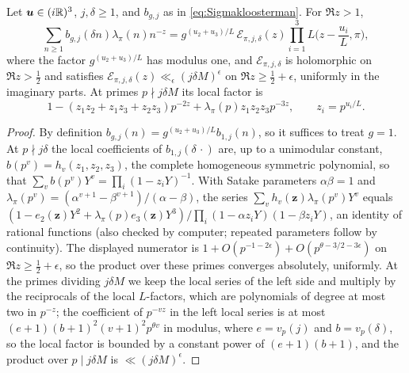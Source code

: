 \documentclass[11pt,colorlinks]{charlie}
\begin{document}
\begin{lemma}\label{lem:euler}
Let $\boldsymbol u\in(i\mathbb{R})^3$, $j,\delta\ge1$, and $b_{g,j}$ as in \eqref{eq:Sigmakloosterman}. For $\Re z>1$,
\[
 \sum_{n\ge1}b_{g,j}(\delta n)\lambda_\pi(n)n^{-z}=g^{(u_2+u_3)/L}\,\mathcal E_{\pi,j,\delta}(z)\prod_{i=1}^3L\Big(z-\frac{u_i}L,\pi\Big),
\]
where the factor $g^{(u_2+u_3)/L}$ has modulus one, and $\mathcal E_{\pi,j,\delta}$ is holomorphic on $\Re z>\frac12$ and satisfies $\mathcal E_{\pi,j,\delta}(z)\ll_\epsilon(j\delta M)^\epsilon$ on $\Re z\ge\frac12+\epsilon$, uniformly in the imaginary parts. At primes $p\nmid j\delta M$ its local factor is
\[
 1-(z_1z_2+z_1z_3+z_2z_3)p^{-2z}+\lambda_\pi(p)z_1z_2z_3p^{-3z},\qquad z_i=p^{u_i/L}.
\]
\end{lemma}
\begin{proof}
By definition $b_{g,j}(n)=g^{(u_2+u_3)/L}b_{1,j}(n)$, so it suffices to treat $g=1$. At $p\nmid j\delta$ the local coefficients of $b_{1,j}(\delta\,\cdot)$ are, up to a unimodular constant, $b(p^v)=h_v(z_1,z_2,z_3)$, the complete homogeneous symmetric polynomial, so that $\sum_vb(p^v)Y^v=\prod_i(1-z_iY)^{-1}$. With Satake parameters $\alpha\beta=1$ and $\lambda_\pi(p^v)=(\alpha^{v+1}-\beta^{v+1})/(\alpha-\beta)$, the series $\sum_vh_v(\boldsymbol z)\lambda_\pi(p^v)Y^v$ equals $(1-e_2(\boldsymbol z)Y^2+\lambda_\pi(p)e_3(\boldsymbol z)Y^3)/\prod_i(1-\alpha z_iY)(1-\beta z_iY)$, an identity of rational functions (also checked by computer; repeated parameters follow by continuity). The displayed numerator is $1+O(p^{-1-2\epsilon})+O(p^{\theta-3/2-3\epsilon})$ on $\Re z\ge\frac12+\epsilon$, so the product over these primes converges absolutely, uniformly. At the primes dividing $j\delta M$ we keep the local series of the left side and multiply by the reciprocals of the local $L$-factors, which are polynomials of degree at most two in $p^{-z}$; the coefficient of $p^{-vz}$ in the left local series is at most $(e+1)(b+1)^2(v+1)^2p^{\theta v}$ in modulus, where $e=v_p(j)$ and $b=v_p(\delta)$, so the local factor is bounded by a constant power of $(e+1)(b+1)$, and the product over $p\mid j\delta M$ is $\ll(j\delta M)^\epsilon$.
\end{proof}
\end{document}

